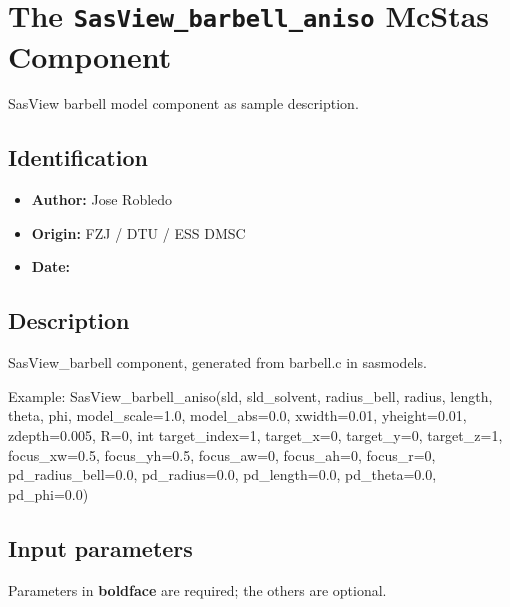 \section{The \texttt{SasView\_barbell\_aniso} McStas Component}
SasView barbell model component as sample description.

\subsection*{Identification}
\begin{itemize}
  \item \textbf{Author:} Jose Robledo
  \item \textbf{Origin:} FZJ / DTU / ESS DMSC
  \item \textbf{Date:} 
\end{itemize}

\subsection*{Description}
SasView\_barbell component, generated from barbell.c in sasmodels.

Example: SasView\_barbell\_aniso(sld, sld\_solvent, radius\_bell, radius, length, theta, phi, model\_scale=1.0, model\_abs=0.0, xwidth=0.01, yheight=0.01, zdepth=0.005, R=0, int target\_index=1, target\_x=0, target\_y=0, target\_z=1, focus\_xw=0.5, focus\_yh=0.5, focus\_aw=0, focus\_ah=0, focus\_r=0, pd\_radius\_bell=0.0, pd\_radius=0.0, pd\_length=0.0, pd\_theta=0.0, pd\_phi=0.0)

\subsection*{Input parameters}
Parameters in \textbf{boldface} are required; the others are optional.

